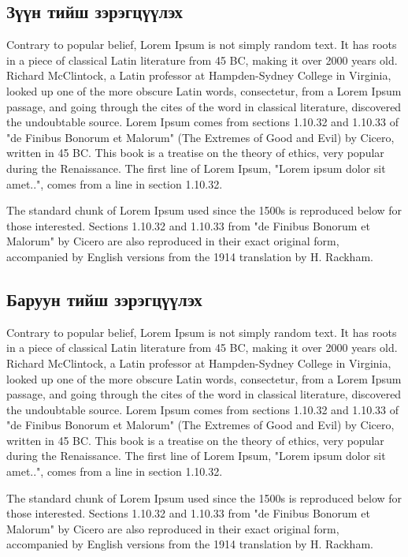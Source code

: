 \documentclass[12pt,A4]{report}
\begin{document}
\subsection{Зүүн тийш зэрэгцүүлэх}
\begin{flushleft}
	Contrary to popular belief, Lorem Ipsum is not simply random text. It has roots in a piece of classical Latin literature from 45 BC, making it over 2000 years old. Richard McClintock, a Latin professor at Hampden-Sydney College in Virginia, looked up one of the more obscure Latin words, consectetur, from a Lorem Ipsum passage, and going through the cites of the word in classical literature, discovered the undoubtable source. Lorem Ipsum comes from sections 1.10.32 and 1.10.33 of "de Finibus Bonorum et Malorum" (The Extremes of Good and Evil) by Cicero, written in 45 BC. This book is a treatise on the theory of ethics, very popular during the Renaissance. The first line of Lorem Ipsum, "Lorem ipsum dolor sit amet..", comes from a line in section 1.10.32.

	The standard chunk of Lorem Ipsum used since the 1500s is reproduced below for those interested. Sections 1.10.32 and 1.10.33 from "de Finibus Bonorum et Malorum" by Cicero are also reproduced in their exact original form, accompanied by English versions from the 1914 translation by H. Rackham.
\end{flushleft}

\subsection{Баруун тийш зэрэгцүүлэх}
\begin{flushright}
	Contrary to popular belief, Lorem Ipsum is not simply random text. It has roots in a piece of classical Latin literature from 45 BC, making it over 2000 years old. Richard McClintock, a Latin professor at Hampden-Sydney College in Virginia, looked up one of the more obscure Latin words, consectetur, from a Lorem Ipsum passage, and going through the cites of the word in classical literature, discovered the undoubtable source. Lorem Ipsum comes from sections 1.10.32 and 1.10.33 of "de Finibus Bonorum et Malorum" (The Extremes of Good and Evil) by Cicero, written in 45 BC. This book is a treatise on the theory of ethics, very popular during the Renaissance. The first line of Lorem Ipsum, "Lorem ipsum dolor sit amet..", comes from a line in section 1.10.32.

	The standard chunk of Lorem Ipsum used since the 1500s is reproduced below for those interested. Sections 1.10.32 and 1.10.33 from "de Finibus Bonorum et Malorum" by Cicero are also reproduced in their exact original form, accompanied by English versions from the 1914 translation by H. Rackham.
\end{flushright}
\end{document}
